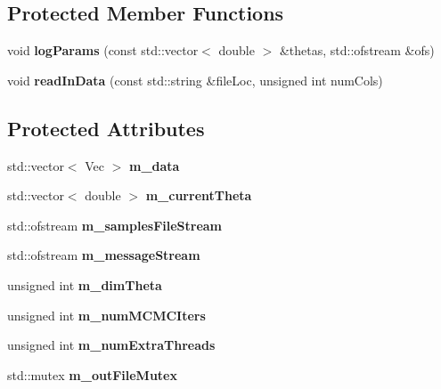 \subsection*{Protected Member Functions}
\begin{DoxyCompactItemize}
\item 
void {\bfseries log\+Params} (const std\+::vector$<$ double $>$ \&thetas, std\+::ofstream \&ofs)\hypertarget{classPmmh_a1195a1095728bcee90b592799ba42ed1}{}\label{classPmmh_a1195a1095728bcee90b592799ba42ed1}

\item 
void {\bfseries read\+In\+Data} (const std\+::string \&file\+Loc, unsigned int num\+Cols)\hypertarget{classPmmh_a98d155a1848aa0aa2990f197966f233b}{}\label{classPmmh_a98d155a1848aa0aa2990f197966f233b}

\end{DoxyCompactItemize}
\subsection*{Protected Attributes}
\begin{DoxyCompactItemize}
\item 
std\+::vector$<$ Vec $>$ {\bfseries m\+\_\+data}\hypertarget{classPmmh_a68acca23cb8cec5c44d6f5fdcb73a784}{}\label{classPmmh_a68acca23cb8cec5c44d6f5fdcb73a784}

\item 
std\+::vector$<$ double $>$ {\bfseries m\+\_\+current\+Theta}\hypertarget{classPmmh_af5511e01b3ebafb7568a3cf854a304d3}{}\label{classPmmh_af5511e01b3ebafb7568a3cf854a304d3}

\item 
std\+::ofstream {\bfseries m\+\_\+samples\+File\+Stream}\hypertarget{classPmmh_aab12bdaa49c1658cf12679b26206ee1d}{}\label{classPmmh_aab12bdaa49c1658cf12679b26206ee1d}

\item 
std\+::ofstream {\bfseries m\+\_\+message\+Stream}\hypertarget{classPmmh_a65cc02f35308e13affb46dd2d9354d97}{}\label{classPmmh_a65cc02f35308e13affb46dd2d9354d97}

\item 
unsigned int {\bfseries m\+\_\+dim\+Theta}\hypertarget{classPmmh_a260f9feda937e6cdc4a0fa35ac2632c1}{}\label{classPmmh_a260f9feda937e6cdc4a0fa35ac2632c1}

\item 
unsigned int {\bfseries m\+\_\+num\+M\+C\+M\+C\+Iters}\hypertarget{classPmmh_a04451fcb2526be1280b62d4dd793a2c6}{}\label{classPmmh_a04451fcb2526be1280b62d4dd793a2c6}

\item 
unsigned int {\bfseries m\+\_\+num\+Extra\+Threads}\hypertarget{classPmmh_a0f0e380bb9ebff32b1b471bce12af5ee}{}\label{classPmmh_a0f0e380bb9ebff32b1b471bce12af5ee}

\item 
std\+::mutex {\bfseries m\+\_\+out\+File\+Mutex}\hypertarget{classPmmh_a35559f0c971442c735a5488335121e31}{}\label{classPmmh_a35559f0c971442c735a5488335121e31}

\end{DoxyCompactItemize}


